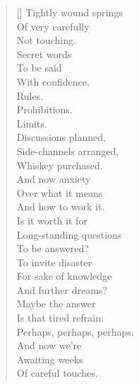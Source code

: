 \begin{verse}[\textwidth]
  Tightly wound springs\\
  Of very carefully\\
  Not touching.\\
  \vin Secret words\\
  \vin To be said\\
  \vin With confidence.\\
  Rules.\\
  Prohibitions.\\
  Limits.\\
  \vin Discussions planned,\\
  \vin Side-channels arranged,\\
  \vin Whiskey purchased.\\
  And now anxiety\\
  Over what it means\\
  And how to work it.\\
  \vin Is it worth it for\\
  \vin Long-standing questions\\
  \vin To be answered?\\
  To invite disaster\\
  For sake of knowledge\\
  And further dreams?\\
  \vin Maybe the answer\\
  \vin Is that tired refrain:\\
  \vin Perhaps, perhaps, perhaps.\\
  And now we're\\
  Awaiting weeks\\
  Of careful touches.
\end{verse}
